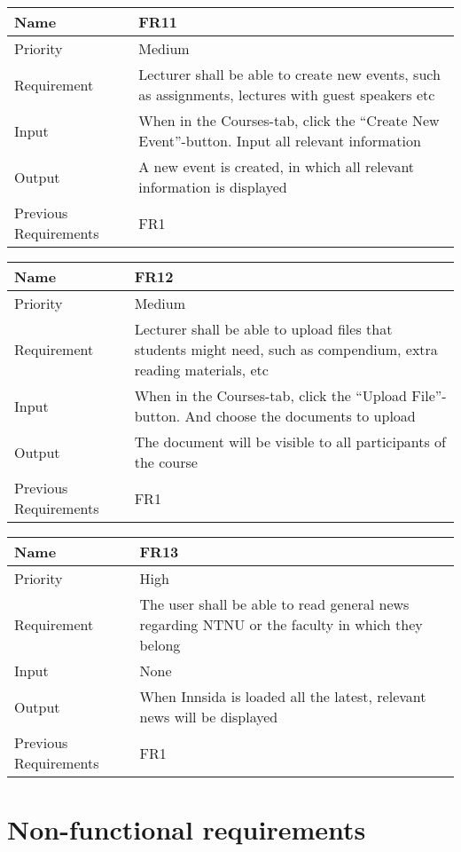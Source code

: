 \begin{tabularx}{\textwidth}{|l|X|}
  \hline
  Name & FR11 \\ \hline
  Priority & Medium \\ \hline
  Requirement & Lecturer shall be able to create new events, such as assignments, lectures with guest speakers etc \\ \hline
  Input & When in the Courses-tab, click the “Create New Event”-button. Input all relevant information \\ \hline
  Output & A new event is created, in which all relevant information is displayed \\ \hline
  Previous Requirements & FR1 \\ \hline
\end{tabularx}

\begin{tabularx}{\textwidth}{|l|X|}
  \hline
  Name & FR12 \\ \hline
  Priority & Medium \\ \hline
  Requirement & Lecturer shall be able to upload files that students might need, such as compendium, extra reading materials, etc \\ \hline
  Input & When in the Courses-tab, click the “Upload File”-button. And choose the documents to upload \\ \hline
  Output & The document will be visible to all participants of the course \\ \hline
  Previous Requirements & FR1 \\ \hline
\end{tabularx}

\begin{tabularx}{\textwidth}{|l|X|}
  \hline
  Name & FR13 \\ \hline
  Priority & High \\ \hline
  Requirement & The user shall be able to read general news regarding NTNU or the faculty in which they belong \\ \hline
  Input & None \\ \hline
  Output & When Innsida is loaded all the latest, relevant news will be displayed \\ \hline
  Previous Requirements & FR1 \\ \hline
\end{tabularx}

\section{Non-functional requirements}

